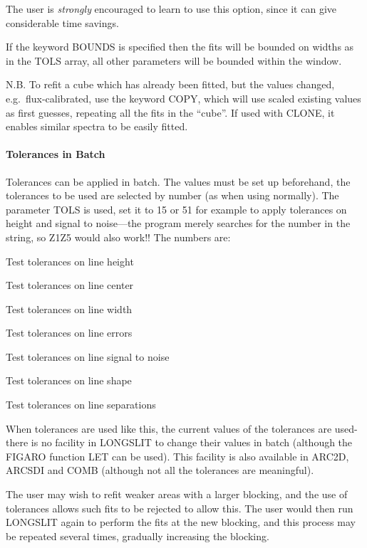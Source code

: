 The user is {\em strongly} encouraged to learn to use this option, since
it can give considerable time savings.

If the keyword BOUNDS is specified then the fits will be bounded on
widths as in the TOLS array, all other parameters will be bounded
within the window.

N.B. To refit a cube which has already been fitted, but the values
changed, e.g.\ flux-calibrated, use the keyword COPY, which will use
scaled existing values as first guesses, repeating all the fits in the
``cube''.
If used with CLONE, it enables similar spectra to be easily fitted. 

\paragraph{Tolerances in Batch}

Tolerances can be applied in batch.
The values must be set up beforehand, the tolerances to be used are
selected by number (as when using normally).
The parameter TOLS is used, set it to 15 or 51 for example to apply
tolerances on height and signal to noise---the program merely searches
for the number in the string, so Z1Z5 would also work!! The numbers are:
\begin{list}{\bf{} ---}{}
\item Test tolerances on line height
\item Test tolerances on line center
\item Test tolerances on line width
\item Test tolerances on line errors
\item Test tolerances on line signal to noise
\item Test tolerances on line shape
\item Test tolerances on line separations
\end{list}

When tolerances are used like this, the current values of the tolerances
are used-there is no facility in LONGSLIT to change their values in
batch (although the FIGARO function LET can be used). This facility is
also available in ARC2D, ARCSDI and COMB (although not all the
tolerances are meaningful).

The user may wish to refit weaker areas with a larger blocking, and the
use of tolerances allows such fits to be rejected to allow this.
The user would then run LONGSLIT again to perform the fits at the new
blocking, and this process may be repeated several times, gradually
increasing the blocking.

